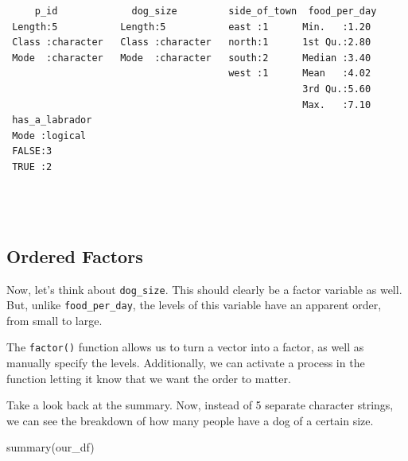 \documentclass[
  letterpaper,
  DIV=11,
  numbers=noendperiod]{scrreprt}
\newenvironment{Shaded}{\begin{snugshade}}{\end{snugshade}}
\newcommand{\AttributeTok}[1]{\textcolor[rgb]{0.40,0.45,0.13}{#1}}
\newcommand{\ConstantTok}[1]{\textcolor[rgb]{0.56,0.35,0.01}{#1}}
\newcommand{\FunctionTok}[1]{\textcolor[rgb]{0.28,0.35,0.67}{#1}}
\newcommand{\NormalTok}[1]{\textcolor[rgb]{0.00,0.23,0.31}{#1}}
\newcommand{\OtherTok}[1]{\textcolor[rgb]{0.00,0.23,0.31}{#1}}
\newcommand{\SpecialCharTok}[1]{\textcolor[rgb]{0.37,0.37,0.37}{#1}}
\newcommand{\StringTok}[1]{\textcolor[rgb]{0.13,0.47,0.30}{#1}}
\begin{document}
\begin{verbatim}
     p_id             dog_size         side_of_town  food_per_day 
 Length:5           Length:5           east :1      Min.   :1.20  
 Class :character   Class :character   north:1      1st Qu.:2.80  
 Mode  :character   Mode  :character   south:2      Median :3.40  
                                       west :1      Mean   :4.02  
                                                    3rd Qu.:5.60  
                                                    Max.   :7.10  
 has_a_labrador 
 Mode :logical  
 FALSE:3        
 TRUE :2        
                
                
                
\end{verbatim}

\subsection{Ordered Factors}\label{ordered-factors}

Now, let's think about \texttt{dog\_size}. This should clearly be a
factor variable as well. But, unlike \texttt{food\_per\_day}, the levels
of this variable have an apparent order, from small to large.

The \texttt{factor()} function allows us to turn a vector into a factor,
as well as manually specify the levels. Additionally, we can activate a
process in the function letting it know that we want the order to
matter.

\begin{Shaded}
\end{Shaded}

Take a look back at the summary. Now, instead of 5 separate character
strings, we can see the breakdown of how many people have a dog of a
certain size.

\begin{Shaded}
\begin{Highlighting}[]
\FunctionTok{summary}\NormalTok{(our\_df)}
\end{Highlighting}
\end{Shaded}
\end{document}

